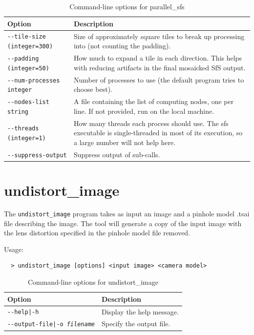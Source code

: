 \begin{longtable}{|l|p{7.5cm}|}
\caption{Command-line options for parallel\_sfs}
\label{tbl:parallel_sfs}
\endfirsthead
\endhead
\endfoot
\endlastfoot
\hline
Option & Description \\ \hline \hline
\texttt{-\/-tile-size (integer=300)} & Size of approximately square tiles to break up processing into (not counting the padding).\\ \hline
\texttt{-\/-padding (integer=50)} & How much to expand a tile in each direction. This helps with reducing artifacts in the final mosaicked SfS output.\\ \hline
\texttt{-\/-num-processes integer} & Number of processes to use (the default program tries to choose best). \\ \hline
\texttt{-\/-nodes-list string} & A file containing the list of computing nodes, one per line. If not provided, run on the local machine.\\ \hline
\texttt{-\/-threads (integer=1)} & How many threads each process should use. The sfs executable is single-threaded in most of its execution, so a large number will not help here.\\ \hline
\texttt{-\/-suppress-output} & Suppress output of sub-calls.\\ \hline
\end{longtable}


\section{undistort\_image}
\label{undistortimage}

The \texttt{undistort\_image} program takes as input an image and a pinhole model .tsai file
describing the image.  The tool will generate a copy of the input image with the lens distortion
specified in the pinhole model file removed.

Usage:
\begin{verbatim}
  > undistort_image [options] <input image> <camera model>
\end{verbatim}

\begin{longtable}{|l|p{7.5cm}|}
\caption{Command-line options for undistort\_image}
\label{tbl:undistortimage}
\endfirsthead
\endhead
\endfoot
\endlastfoot
\hline
Option & Description \\ \hline \hline
\texttt{-\/-help|-h} & Display the help message. \\ \hline
\texttt{-\/-output-file|-o \textit{filename}} & Specify the output file. \\ \hline
\end{longtable}


